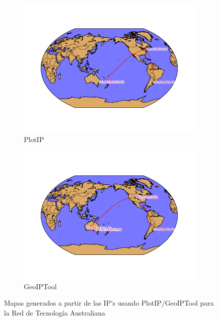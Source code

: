 \begin{figure}[ht]
	\begin{subfigure}[b]{0.5\textwidth}
		\centering
		\includegraphics[width=\linewidth]{imagenes/mapa_australia_plotip.png}
		\caption{PlotIP}
		\label{fig:mapa_tsu_plotip}
	\end{subfigure} 
	\begin{subfigure}[b]{0.5\textwidth}
		\centering
		\includegraphics[width=\linewidth]{imagenes/mapa_australia_geoip.png}
		\caption{GeoIPTool}
	\end{subfigure} 
	\caption{Mapas generados a partir de las IP's usando PlotIP/GeoIPTool para la Red de Tecnología Australiana}
	\label{fig:mapas_australia}
\end{figure}

